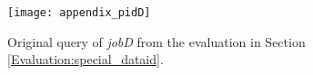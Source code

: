 \documentclass[draft,final]{vutinfth} %
\begin{document}
\begin{figure}[h]
	\centering
	\texttt{[image: appendix\_pidD]}
	\caption{Original query of \textit{jobD} from the evaluation in Section \ref{Evaluation:special_dataid}.}
	\label{fig:appendix_pidD} %
\end{figure}

\backmatter

\listoffigures %

\cleardoublepage %
\listoftables %

\listoflistings


\printindex
\newpage
\printglossaries



\end{document}
